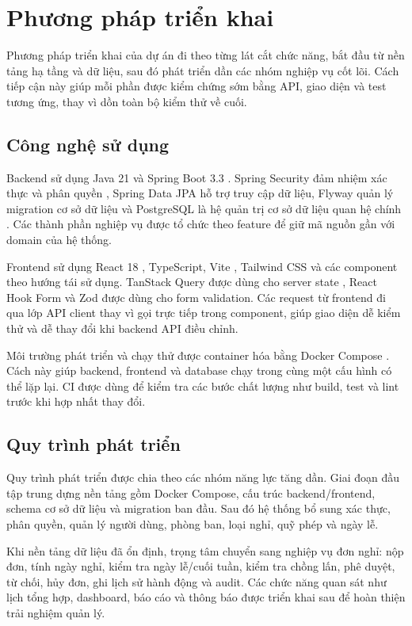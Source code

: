 \section{Phương pháp triển khai}
Phương pháp triển khai của dự án đi theo từng lát cắt chức năng, bắt đầu từ nền tảng hạ tầng và dữ liệu, sau đó phát triển dần các nhóm nghiệp vụ cốt lõi. Cách tiếp cận này giúp mỗi phần được kiểm chứng sớm bằng API, giao diện và test tương ứng, thay vì dồn toàn bộ kiểm thử về cuối.

\subsection{Công nghệ sử dụng}
Backend sử dụng Java 21 và Spring Boot 3.3 \cite{spring-boot}. Spring Security đảm nhiệm xác thực và phân quyền \cite{spring-security}, Spring Data JPA hỗ trợ truy cập dữ liệu, Flyway quản lý migration cơ sở dữ liệu \cite{flyway} và PostgreSQL là hệ quản trị cơ sở dữ liệu quan hệ chính \cite{postgresql}. Các thành phần nghiệp vụ được tổ chức theo feature để giữ mã nguồn gần với domain của hệ thống.

Frontend sử dụng React 18 \cite{react}, TypeScript, Vite \cite{vite}, Tailwind CSS \cite{tailwind} và các component theo hướng tái sử dụng. TanStack Query được dùng cho server state \cite{tanstack-query}, React Hook Form \cite{react-hook-form} và Zod \cite{zod} được dùng cho form validation. Các request từ frontend đi qua lớp API client thay vì gọi trực tiếp trong component, giúp giao diện dễ kiểm thử và dễ thay đổi khi backend API điều chỉnh.

Môi trường phát triển và chạy thử được container hóa bằng Docker Compose \cite{docker}. Cách này giúp backend, frontend và database chạy trong cùng một cấu hình có thể lặp lại. CI được dùng để kiểm tra các bước chất lượng như build, test và lint trước khi hợp nhất thay đổi.

\subsection{Quy trình phát triển}
Quy trình phát triển được chia theo các nhóm năng lực tăng dần. Giai đoạn đầu tập trung dựng nền tảng gồm Docker Compose, cấu trúc backend/frontend, schema cơ sở dữ liệu và migration ban đầu. Sau đó hệ thống bổ sung xác thực, phân quyền, quản lý người dùng, phòng ban, loại nghỉ, quỹ phép và ngày lễ.

Khi nền tảng dữ liệu đã ổn định, trọng tâm chuyển sang nghiệp vụ đơn nghỉ: nộp đơn, tính ngày nghỉ, kiểm tra ngày lễ/cuối tuần, kiểm tra chồng lấn, phê duyệt, từ chối, hủy đơn, ghi lịch sử hành động và audit. Các chức năng quan sát như lịch tổng hợp, dashboard, báo cáo và thông báo được triển khai sau để hoàn thiện trải nghiệm quản lý.

